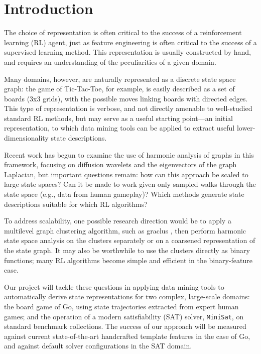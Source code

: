 \section{Introduction}

The choice of representation is often critical to the success of a
reinforcement learning (RL) agent, just as feature engineering is often
critical to the success of a supervised learning method. This representation is
usually constructed by hand, and requires an understanding of the peculiarities
of a given domain.

Many domains, however, are naturally represented as a discrete state space
graph: the game of Tic-Tac-Toe, for example, is easily described as a set of
boards (3x3 grids), with the possible moves linking boards with directed edges.
This type of representation is verbose, and not directly amenable to
well-studied standard RL methods, but may serve as a useful starting point---an
initial representation, to which data mining tools can be applied to extract
useful lower-dimensionality state descriptions.

Recent work \citep{Wang2009Multiscale,Mahadevan2006Value,Coifman06Diffusion} has 
begun to examine the use of harmonic analysis of graphs in this framework, 
focusing on diffusion wavelets and the eigenvectors of the graph Laplacian, but 
important questions remain: how can this approach be scaled to large state spaces? 
Can it be made to work given only sampled walks through the state space (e.g., data 
from human gameplay)? Which methods generate state descriptions suitable for which 
RL algorithms?

To address scalability, one possible research direction would be to apply a
multilevel graph clustering algorithm, such as graclus
\citep{Dhillon07weightedgraph}, then perform harmonic state space analysis on
the clusters separately or on a coarsened representation of the state graph. It
may also be worthwhile to use the clusters directly as binary functions; many
RL algorithms become simple and efficient in the binary-feature case.  

Our project will tackle these questions in applying data mining tools to
automatically derive state representations for two complex, large-scale
domains: the board game of Go, using state trajectories extracted from expert
human games; and the operation of a modern satisfiability (SAT) solver,
\texttt{MiniSat}, on standard benchmark collections. The success of our
approach will be measured against current state-of-the-art handcrafted template
features \citep{Silver2007Shape} in the case of Go, and against default solver
configurations in the SAT domain. 

